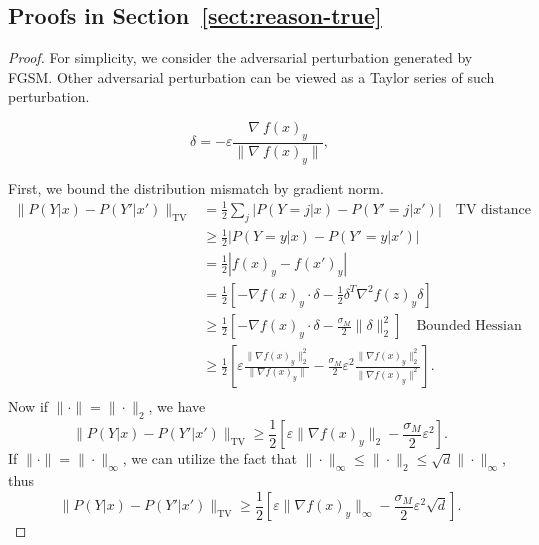 \subsection{Proofs in Section~\ref{sect:reason-true}}
\label{sect:label-noise-more-proof}



\begin{proof}
For simplicity, we consider the adversarial perturbation generated by FGSM. Other adversarial perturbation can be viewed as a Taylor series of such perturbation.

    \begin{equation}
        \delta = -\varepsilon  \frac{\nabla~f(x)_y}{\|\nabla~ f(x)_y\|},  
    \end{equation}

First, we bound the distribution mismatch by gradient norm.
$$
    \begin{aligned}
    \|P(Y|x) - P(Y'|x')\|_{\text{TV}}
    & = \frac{1}{2} \sum_j \left|P(Y=j|x) - P(Y'=j|x')\right|\quad \boxed{\text{TV distance}}\\
    & \ge \frac{1}{2} \left|P(Y=y|x) - P(Y'=y|x')\right|\\
    & = \frac{1}{2} \left|f(x)_{y} - f(x')_{y}\right| \\
    & = \frac{1}{2} \left[ -\nabla f(x)_{y} \cdot \delta - \frac{1}{2}\delta^T \nabla^2 f(z)_{y} \delta \right]\\
    & \ge \frac{1}{2} \left[-\nabla f(x)_{y} \cdot \delta - \frac{\sigma_M}{2}\|\delta\|_2^2\right]  \quad \boxed{\text{Bounded Hessian}} \\ %
    & \ge \frac{1}{2} \left[\varepsilon \frac{\|\nabla f(x)_{y}\|^2_2}{\|\nabla f(x)_{y}\|} - \frac{\sigma_M}{2} \varepsilon^2 \frac{\|\nabla f(x)_{y}\|^2_2}{\|\nabla f(x)_{y}\|^2}  \right].\\
    \end{aligned}
$$
Now if $\|\cdot\| = \|\cdot\|_2$, we have
\begin{equation}
  \label{eq:mismatch-bound-l2}
  \|P(Y|x) - P(Y'|x')\|_{\text{TV}} \ge \frac{1}{2} \left[\varepsilon \|\nabla f(x)_{y}\|_2 - \frac{\sigma_M}{2}\varepsilon^2\right].    
\end{equation}
If $\|\cdot\| = \|\cdot\|_\infty$, we can utilize the fact that $\|\cdot\|_\infty \le \|\cdot\|_2 \le \sqrt{d} \|\cdot\|_\infty$,
thus 
\begin{equation}
    \label{eq:mismatch-bound-linf}
    \|P(Y|x) - P(Y'|x')\|_{\text{TV}} \ge \frac{1}{2} \left[\varepsilon \|\nabla f(x)_{y}\|_\infty - \frac{\sigma_M}{2} \varepsilon^2 \sqrt{d}\right].
\end{equation}
    

\end{proof}
